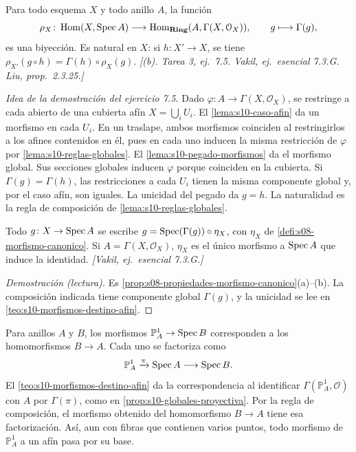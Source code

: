 \begin{teo}[El teorema de la 8b]
\label{teo:s10-morfismos-destino-afin}
Para todo esquema \(X\) y todo anillo \(A\), la función
\[
 \rho_X\colon\operatorname{Hom}(X,\operatorname{Spec} A)\longrightarrow
 \operatorname{Hom}_{\mathbf{Ring}}(A,\Gamma(X,\mathcal O_X)),\qquad
 g\longmapsto\Gamma(g),
\]
es una biyección. Es natural en \(X\): si \(h\colon X'\to X\), se tiene \(\rho_{X'}(g\circ h)=\Gamma(h)\circ\rho_X(g)\). \emph{[(b). Tarea 3, ej.~7.5. Vakil, ej.~esencial 7.3.G. Liu, prop.~2.3.25.]}
\end{teo}

\emph{Idea de la demostración del ejercicio 7.5.} Dado \(\varphi\colon A\to\Gamma(X,\mathcal O_X)\), se restringe a cada abierto de una cubierta afín \(X=\bigcup_i U_i\). El \cref{lema:s10-caso-afin} da un morfismo en cada \(U_i\). En un traslape, ambos morfismos coinciden al restringirlos a los afines contenidos en él, pues en cada uno inducen la misma restricción de \(\varphi\) por \cref{lema:s10-reglas-globales}. El \cref{lema:s10-pegado-morfismos} da el morfismo global. Sus secciones globales inducen \(\varphi\) porque coinciden en la cubierta. Si \(\Gamma(g)=\Gamma(h)\), las restricciones a cada \(U_i\) tienen la misma componente global y, por el caso afín, son iguales. La unicidad del pegado da \(g=h\). La naturalidad es la regla de composición de \cref{lema:s10-reglas-globales}.

\begin{coro}
\label{coro:s10-factorizacion-canonica}
Todo \(g\colon X\to\operatorname{Spec} A\) se escribe \(g=\operatorname{Spec}(\Gamma(g))\circ\eta_X\), con \(\eta_X\) de \cref{defi:s08-morfismo-canonico}. Si \(A=\Gamma(X,\mathcal O_X)\), \(\eta_X\) es el único morfismo a \(\operatorname{Spec} A\) que induce la identidad. \emph{[Vakil, ej.~esencial 7.3.G.]}
\end{coro}
\begin{proof}[Demostración (lectura)]
Es \cref{prop:s08-propiedades-morfismo-canonico}(a)--(b). La composición indicada tiene componente global \(\Gamma(g)\), y la unicidad se lee en \cref{teo:s10-morfismos-destino-afin}.
\end{proof}

\begin{ejem}
\label{ejem:s10-proyectiva-destino-afin}
Para anillos \(A\) y \(B\), los morfismos \(\mathbb P^1_A\to\operatorname{Spec} B\) corresponden a los homomorfismos \(B\to A\). Cada uno se factoriza como
\[
 \mathbb P^1_A\xrightarrow{\pi}\operatorname{Spec} A\longrightarrow\operatorname{Spec} B.
\]
El \cref{teo:s10-morfismos-destino-afin} da la correspondencia al identificar \(\Gamma(\mathbb P_A^1,\mathcal O)\) con \(A\) por \(\Gamma(\pi)\), como en \cref{prop:s10-globales-proyectiva}. Por la regla de composición, el morfismo obtenido del homomorfismo \(B\to A\) tiene esa factorización. Así, aun con fibras que contienen varios puntos, todo morfismo de \(\mathbb P^1_A\) a un afín pasa por su base.
\end{ejem}



